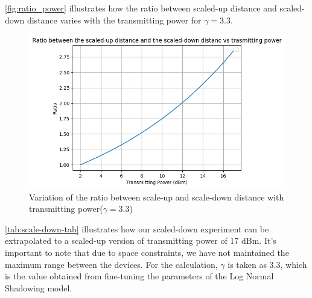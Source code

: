 \autoref{fig:ratio_power} illustrates how the ratio between scaled-up distance and scaled-down distance varies with the transmitting power for $\gamma = 3.3$.\\
\begin{figure}
    \centering
    \includegraphics[width=0.8\linewidth]{images/power_ration.png}
    \caption{Variation of the ratio between scale-up and scale-down distance with transmitting power($\gamma = 3.3$)}
    \label{fig:ratio_power}
\end{figure}

\autoref{tab:scale-down-tab} illustrates how our scaled-down experiment can be extrapolated to a scaled-up version of transmitting power of 17 dBm. It's important to note that due to space constraints, we have not maintained the maximum range between the devices. For the calculation, \( \gamma \) is taken as 3.3, which is the value obtained from fine-tuning the parameters of the Log Normal Shadowing model.


